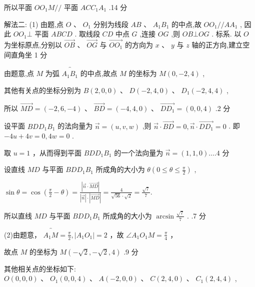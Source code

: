 \documentclass[10pt]{article}
\begin{document}
所以平面 \(O{O}_{1}M//\) 平面 \({AC}{C}_{1}{A}_{1}\) .14 分

解法二: (1) 由题,点 \(O\text{ 、 }{O}_{1}\) 分别为线段 \({AB}\text{ 、 }{A}_{1}{B}_{1}\) 的中点,故 \(O{O}_{1}//A{A}_{1}\) , 因此 \(O{O}_{1} \bot\) 平面 \({ABCD}\) . 取线段 \({CD}\) 中点 \(G\) ,连接 \({OG}\) ,则 \({OB} \bot  {OG}\) . 标系. 以 \(O\) 为坐标原点,分别以 \(\overrightarrow{OB}\text{ 、 }\overrightarrow{OG}\) 与 \(\overrightarrow{O{O}_{1}}\) 的方向为 \(x\text{ 、 }y\) 与 \(z\) 轴的正方向,建立空间直角坐 1 分

由题意,点 \(M\) 为弧 \(\overset{\text{ ⏜ }}{{A}_{1}{B}_{1}}\) 的中点,故点 \(M\) 的坐标为 \(M\left( {0, - 2,4}\right)\) ,

其他有关点的坐标分别为 \(B\left( {2,0,0}\right) \text{ 、 }D\left( {-2,4,0}\right) \text{ 、 }{D}_{1}\left( {-2,4,4}\right)\) ,

所以 \(\overrightarrow{MD} = \left( {-2,6, - 4}\right) \text{ 、 }\overrightarrow{BD} = \left( {-4,4,0}\right) \text{ 、 }\overrightarrow{D{D}_{1}} = \left( {0,0,4}\right)\) .2 分

设平面 \({BD}{D}_{1}{B}_{1}\) 的法向量为 \(\overrightarrow{n} = \left( {u,v,w}\right)\) ,则 \(\overrightarrow{n} \cdot  \overrightarrow{BD} = 0,\overrightarrow{n} \cdot  \overrightarrow{D{D}_{1}} = 0\) . 即 \(- {4u} + {4v} = 0,{4w} = 0\) .

取 \(u = 1\) ，从而得到平面 \({BD}{D}_{1}{B}_{1}\) 的一个法向量为 \(\overrightarrow{n} = \left( {1,1,0}\right) \ldots {.4}\) 分

设直线 \({MD}\) 与平面 \({BD}{D}_{1}{B}_{1}\) 所成角的大小为 \(\theta \left( {0 \leq  \theta  \leq  \frac{\pi }{2}}\right)\) ,

\(\sin \theta  = \cos \left( {\frac{\pi }{2} - \theta }\right)  = \frac{\left| \overrightarrow{n} \cdot  \overrightarrow{MD}\right| }{\left| \overrightarrow{n}\right|  \cdot  \left| \overrightarrow{MD}\right| } = \frac{4}{\sqrt{56} \cdot  \sqrt{2}} = \frac{\sqrt{7}}{7}.\)

所以直线 \({MD}\) 与平面 \({BD}{D}_{1}{B}_{1}\) 所成角的大小为 \(\arcsin \frac{\sqrt{7}}{7}\) . .7 分

(2)由题意， \(\overset{\text{ ⏜ }}{{A}_{1}M} = \frac{\pi }{2},\left| {{A}_{1}{O}_{1}}\right|  = 2\) ，故 \(\angle {A}_{1}{O}_{1}M = \frac{\pi }{4}\) ，

故点 \(M\) 的坐标为 \(M\left( {-\sqrt{2}, - \sqrt{2},4}\right)\) .9 分

其他相关点的坐标如下: \(O\left( {0,0,0}\right) \text{ 、 }{O}_{1}\left( {0,0,4}\right) \text{ 、 }A\left( {-2,0,0}\right) \text{ 、 }C\left( {2,4,0}\right) \text{ 、 }{C}_{1}\left( {2,4,4}\right)\) ,
\end{document}
